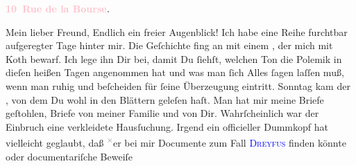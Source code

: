            \pstart
           \begin{otherlanguage}{french}\textcolor{gray}{\textbf{\textbf{\textcolor{pink}{10 Rue de la Bourse}{}\ledrightnote{\textcolor{pink}{rue de la Bourse}}.}}}\end{otherlanguage}\pend
           \pstart\center{}Mein lieber Freund,\pend\pstart
           Endlich ein freier Augenblick! Ich habe eine Reihe furchtbar aufgeregter Tage hinter
               mir. Die Geſchichte fing an mit einem \label{K_L02833-1v}\label{K_L02833-1h}, der mich mit Koth bewarf. Ich lege ihn Dir bei, damit Du ſiehſt,
                   welchen Ton die Polemik in dieſen heißen Tagen
               angenommen hat und was man ſich Alles ſagen laſſen muß, wenn man ruhig und beſcheiden
               für ſeine Überzeugung eintritt. Sonntag kam der
                  \label{K_L02833-2v}\label{K_L02833-2h}, von dem Du wohl in den Blättern geleſen haſt. Man hat mir
               meine Briefe geſtohlen, {\pb}Briefe von meiner Familie
               und von Dir. Wahrſcheinlich war der Einbruch eine verkleidete Hausſuchung. Irgend ein
               officieller Dummkopf hat vielleicht geglaubt, daß \substVorne{}\textsuperscript{\textcolor{gray}{×}}\substDazwischen{}e\substHinten{}r bei mir Documente zum Fall \textsc{\textcolor{blue}{Dreyfus}{}\ledrightnote{\textcolor{blue}{Alfred Dreyfus}}} finden könnte oder  documentariſche Beweiſe

